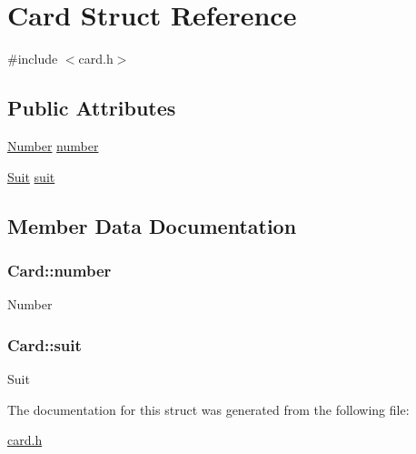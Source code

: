 \hypertarget{structCard}{\section{Card Struct Reference}
\label{structCard}
}


{\ttfamily \#include $<$card.\+h$>$}

\subsection*{Public Attributes}
\begin{DoxyCompactItemize}
\item 
\hyperlink{card_8h_a0764905e1a892d668acfcc35d5a79d36}{Number} \hyperlink{structCard_a3dbccade15d7013d910de40a03a1f7a3}{number}
\item 
\hyperlink{card_8h_a69f3804e9f1171f60c185d5a5f9725e2}{Suit} \hyperlink{structCard_a5f7fd2ad3843c8f42b9f00c800bad8cb}{suit}
\end{DoxyCompactItemize}


\subsection{Member Data Documentation}
\hypertarget{structCard_a3dbccade15d7013d910de40a03a1f7a3}{
\subsubsection[{number}]{ Card\+::number}}\label{structCard_a3dbccade15d7013d910de40a03a1f7a3}
Number \hypertarget{structCard_a5f7fd2ad3843c8f42b9f00c800bad8cb}{
\subsubsection[{suit}]{ Card\+::suit}}\label{structCard_a5f7fd2ad3843c8f42b9f00c800bad8cb}
Suit 

The documentation for this struct was generated from the following file\+:\begin{DoxyCompactItemize}
\item 
\hyperlink{card_8h}{card.\+h}\end{DoxyCompactItemize}
